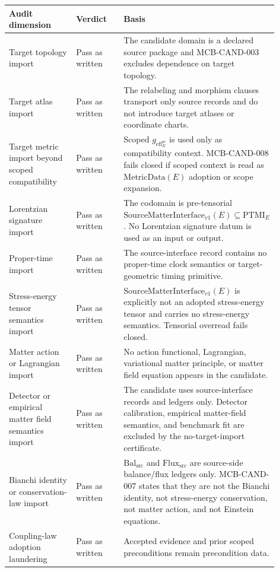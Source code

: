 \documentclass[11pt]{article}
\newcommand{\MetricData}{\mathrm{MetricData}}
\newcommand{\geff}{g_{\mathrm{eff}}}
\newcommand{\SMI}{\mathrm{SourceMatterInterface}_{v1}}
\newcommand{\PTMI}{\mathrm{PTMI}}
\newcommand{\BalSrc}{\mathrm{Bal}_{\mathrm{src}}}
\newcommand{\FluxSrc}{\mathrm{Flux}_{\mathrm{src}}}
\begin{document}
\begin{longtable}{p{0.28\linewidth}p{0.20\linewidth}p{0.42\linewidth}}
\toprule
Audit dimension & Verdict & Basis \\
\midrule
Target topology import &
Pass as written &
The candidate domain is a declared source package and MCB-CAND-003 excludes
dependence on target topology. \\
\addlinespace
Target atlas import &
Pass as written &
The relabeling and morphism clauses transport only source records and do not
introduce target atlases or coordinate charts. \\
\addlinespace
Target metric import beyond scoped compatibility &
Pass as written &
Scoped \(\geff_E^{\mathrm{sc}}\) is used only as compatibility context.
MCB-CAND-008 fails closed if scoped context is read as \(\MetricData(E)\)
adoption or scope expansion. \\
\addlinespace
Lorentzian signature import &
Pass as written &
The codomain is pre-tensorial \(\SMI(E)\subseteq\PTMI_E\). No Lorentzian
signature datum is used as an input or output. \\
\addlinespace
Proper-time import &
Pass as written &
The source-interface record contains no proper-time clock semantics or
target-geometric timing primitive. \\
\addlinespace
Stress-energy tensor semantics import &
Pass as written &
\(\SMI(E)\) is explicitly not an adopted stress-energy tensor and carries no
stress-energy semantics. Tensorial overread fails closed. \\
\addlinespace
Matter action or Lagrangian import &
Pass as written &
No action functional, Lagrangian, variational matter principle, or matter
field equation appears in the candidate. \\
\addlinespace
Detector or empirical matter field semantics import &
Pass as written &
The candidate uses source-interface records and ledgers only. Detector
calibration, empirical matter-field semantics, and benchmark fit are excluded
by the no-target-import certificate. \\
\addlinespace
Bianchi identity or conservation-law import &
Pass as written &
\(\BalSrc\) and \(\FluxSrc\) are source-side balance/flux ledgers only.
MCB-CAND-007 states that they are not the Bianchi identity, not
stress-energy conservation, not matter action, and not Einstein equations. \\
\addlinespace
Coupling-law adoption laundering &
Pass as written &
Accepted evidence and prior scoped preconditions remain precondition data.

\end{longtable}
\end{document}
